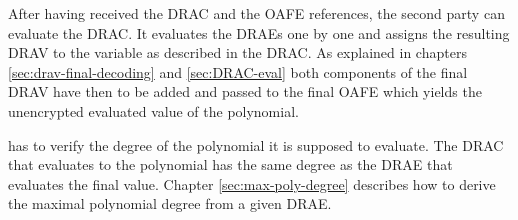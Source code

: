 After having received the DRAC and the OAFE references, the second party can
evaluate the DRAC. It evaluates the DRAEs one by one and assigns the resulting
DRAV to the variable as described in the DRAC. As explained in chapters
\ref{sec:drav-final-decoding} and \ref{sec:DRAC-eval} both components of the
final DRAV have then to be added and passed to the final OAFE which yields the
unencrypted evaluated value of the polynomial.


\label{sec:checking-poly-degree}

\JWpTwo{} has to verify the degree of the polynomial it is supposed to evaluate.
The DRAC that evaluates to the polynomial has the same degree as the DRAE that
evaluates the final value. Chapter \ref{sec:max-poly-degree} describes how
to derive the maximal polynomial degree from a given DRAE.


%
%
\label{sec:example}



